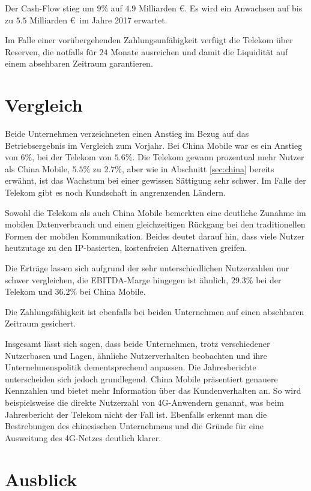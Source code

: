 Der Cash-Flow stieg um $9\%$ auf $4.9$ Milliarden \euro. Es wird ein Anwachsen auf bis zu $5.5$ Milliarden \euro \ im Jahre 2017 erwartet. 

Im Falle einer vorübergehenden Zahlungsunfähigkeit verfügt die Telekom über Reserven, die notfalls für $24$ Monate ausreichen und damit die Liquidität auf einem absehbaren Zeitraum garantieren.    

\section{Vergleich}
\label{sec:vergleich}

Beide Unternehmen verzeichneten einen Anstieg im Bezug auf das Betriebsergebnis im Vergleich zum Vorjahr. Bei China Mobile war es ein Anstieg von $6\%$, bei der Telekom von $5.6\%$. Die Telekom gewann prozentual mehr Nutzer als China Mobile, $5.5\%$ zu $2.7\%$, aber wie in Abschnitt \ref{sec:china} bereits erwähnt, ist das Wachstum bei einer gewissen Sättigung sehr schwer. Im Falle der Telekom gibt es noch Kundschaft in angrenzenden Ländern.

Sowohl die Telekom als auch China Mobile bemerkten eine deutliche Zunahme im mobilen Datenverbrauch und einen gleichzeitigen Rückgang bei den traditionellen Formen der mobilen Kommunikation. Beides deutet darauf hin, dass viele Nutzer heutzutage zu den IP-basierten, kostenfreien Alternativen greifen.

Die Erträge lassen sich aufgrund der sehr unterschiedlichen Nutzerzahlen nur schwer vergleichen, die EBITDA-Marge hingegen ist ähnlich, $29.3\%$ bei der Telekom und $36.2\%$ bei China Mobile. 

Die Zahlungsfähigkeit ist ebenfalls bei beiden Unternehmen auf einen absehbaren Zeitraum gesichert.  

Insgesamt lässt sich sagen, dass beide Unternehmen, trotz verschiedener Nutzerbasen und Lagen, ähnliche Nutzerverhalten beobachten und ihre Unternehmenspolitik dementsprechend anpassen. Die Jahresberichte unterscheiden sich jedoch grundlegend. China Mobile präsentiert genauere Kennzahlen und bietet mehr Information über das Kundenverhalten an. So wird beispielsweise die direkte Nutzerzahl von 4G-Anwendern genannt, was beim Jahresbericht der Telekom nicht der Fall ist. Ebenfalls erkennt man die Bestrebungen des chinesischen Unternehmens und die Gründe für eine Ausweitung des 4G-Netzes deutlich klarer.  

\section{Ausblick}

